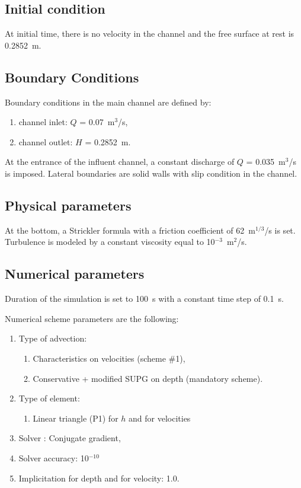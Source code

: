\subsection{Initial condition}

At initial time, there is no velocity in the channel and the free surface at
rest is 0.2852~m.

\subsection{Boundary Conditions}

Boundary conditions in the main channel are defined by:
\begin{enumerate}
\item[\textbullet] channel inlet: $Q$ = 0.07~m$^3$/s,
\item[\textbullet] channel outlet: $H$ = 0.2852~m.
\end{enumerate}

At the entrance of the influent channel, a constant discharge of
$Q$ = 0.035~m$^3$/s is imposed.
Lateral boundaries are solid walls with slip condition in the channel.

\subsection{Physical parameters}

At the bottom, a Strickler formula with a friction coefficient of 62~m$^{1/3}$/s
is set.
Turbulence is modeled by a constant viscosity equal to 10$^{-3}$~m$^2$/s.

\subsection{Numerical parameters}

Duration of the simulation is set to 100~s with a constant time step of 0.1~s.

Numerical scheme parameters are the following:
\begin{enumerate}
  \item[\textendash] Type of advection:
  \begin{enumerate}
    \item[\textbullet] Characteristics on velocities (scheme \#1),
    \item[\textbullet] Conservative + modified SUPG on depth (mandatory scheme).
  \end{enumerate}
  \item[\textendash] Type of element:
  \begin{enumerate}
    \item[\textbullet] Linear triangle (P1) for $h$ and for velocities
  \end{enumerate}
  \item[\textendash] Solver : Conjugate gradient,
  \item[\textendash] Solver accuracy: 10$^{-10}$
  \item[\textendash] Implicitation for depth and for velocity: 1.0.
\end{enumerate}

